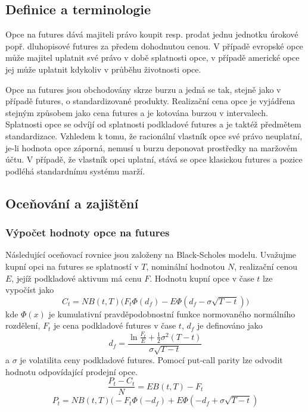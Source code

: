 \documentclass[a4paper]{book}
\begin{document}
\subsection{Definice a terminologie}

Opce na futures dává majiteli právo koupit resp. prodat jednu jednotku úrokové popř. dluhopisové futures za předem dohodnutou cenou. V případě evropské opce může majitel uplatnit své právo v době splatnosti opce, v případě americké opce jej může uplatnit kdykoliv v průběhu životnosti opce.

Opce na futures jsou obchodovány skrze burzu a jedná se tak, stejně jako v případě futures, o standardizované produkty. Realizační cena opce je vyjádřena stejným způsobem jako cena futures a je kotována burzou v intervalech. Splatnosti opce se odvíjí od splatnosti podkladové futures a je taktéž předmětem standardizace. Vzhledem k tomu, že racionální vlastník opce své právo neuplatní, je-li hodnota opce záporná, nemusí u burzu deponovat prostředky na maržovém účtu. V případě, že vlastník opci uplatní, stává se opce klasickou futures a pozice podléhá standardnímu systému marží. 

\subsection{Oceňování a zajištění}

\subsubsection{Výpočet hodnoty opce na futures}

Následující oceňovací rovnice jsou založeny na Black-Scholes modelu. Uvažujme kupní opci na futures se splatností v $T$, nominální hodnotou $N$, realizační cenou $E$, jejíž podkladové aktivum má cenu $F$. Hodnotu kupní opce v čase $t$ lze vypočíst jako
\begin{equation*}
C_t = N B(t,T) \big( F_t \Phi(d_f) - E \Phi(d_f - \sigma \sqrt{T - t})\big)
\end{equation*}
kde
$\Phi(x)$ je kumulativní pravděpodobnostní funkce normovaného normálního rozdělení, $F_t$ je cena podkladové futures v čase $t$, $d_f$ je definováno jako
\begin{equation*}
d_f = \frac{\ln \frac{F_t}{E} + \frac{1}{2}\sigma^2(T-t)}{\sigma \sqrt{T-t}}
\end{equation*}
a $\sigma$ je volatilita ceny podkladové futures. Pomocí put-call parity lze odvodit hodnotu odpovídající prodejní opce.
\begin{equation*}
\frac{P_t - C_t}{N} = E B(t,T) - F_t
\end{equation*}
\begin{equation*}
P_t = N B(t,T)\big(-F_t \Phi(-d_f) + E \Phi(-d_f + \sigma \sqrt{T-t})
\end{equation*}
\end{document}
